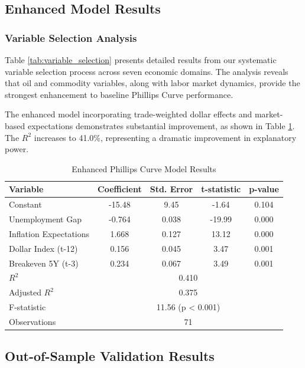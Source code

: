 \documentclass[12pt]{article}
\begin{document}
\subsection{Enhanced Model Results}

\subsubsection{Variable Selection Analysis}

Table \ref{tab:variable_selection} presents detailed results from our systematic variable selection process across seven economic domains. The analysis reveals that oil and commodity variables, along with labor market dynamics, provide the strongest enhancement to baseline Phillips Curve performance.


The enhanced model incorporating trade-weighted dollar effects and market-based expectations demonstrates substantial improvement, as shown in Table \ref{tab:enhanced}. The $R^2$ increases to 41.0\%, representing a dramatic improvement in explanatory power.

\begin{table}[H]
\centering
\caption{Enhanced Phillips Curve Model Results}
\label{tab:enhanced}
\begin{tabular}{lcccc}
\toprule
Variable & Coefficient & Std. Error & t-statistic & p-value \\
\midrule
Constant & -15.48 & 9.45 & -1.64 & 0.104 \\
Unemployment Gap & -0.764 & 0.038 & -19.99 & 0.000 \\
Inflation Expectations & 1.668 & 0.127 & 13.12 & 0.000 \\
Dollar Index (t-12) & 0.156 & 0.045 & 3.47 & 0.001 \\
Breakeven 5Y (t-3) & 0.234 & 0.067 & 3.49 & 0.001 \\
\midrule
$R^2$ & \multicolumn{4}{c}{0.410} \\
Adjusted $R^2$ & \multicolumn{4}{c}{0.375} \\
F-statistic & \multicolumn{4}{c}{11.56 (p < 0.001)} \\
Observations & \multicolumn{4}{c}{71} \\
\bottomrule
\end{tabular}
\end{table}

\subsection{Out-of-Sample Validation Results}
\end{document}

